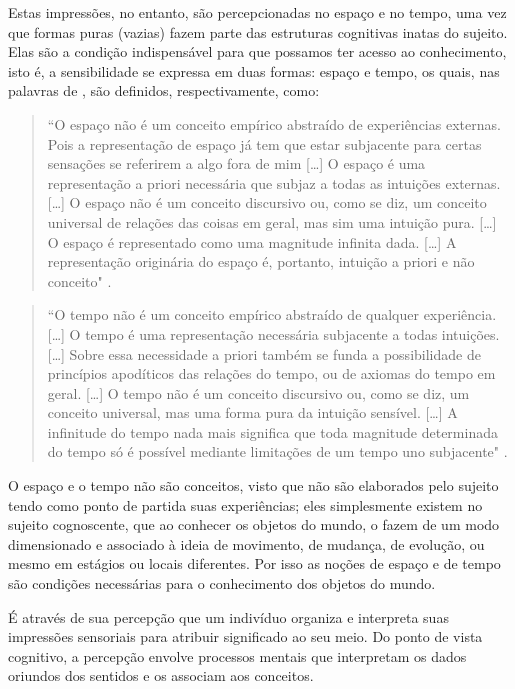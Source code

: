 Estas impressões, no entanto, são percepcionadas no espaço e no tempo, uma vez que formas puras (vazias) fazem parte das estruturas cognitivas inatas do sujeito. Elas são a condição indispensável para que possamos ter acesso ao conhecimento, isto é, a sensibilidade se expressa em duas formas: espaço e tempo, os  quais, nas palavras de , são definidos, respectivamente, como:

\begin{quote}
``O espaço não é um conceito empírico abstraído de experiências externas. Pois a representação de espaço já tem que estar subjacente para certas sensações se referirem a algo fora de mim […] O espaço é uma representação a priori necessária que subjaz a todas as intuições externas. […] O espaço não é um conceito discursivo ou, como se diz, um conceito universal de relações das coisas em geral, mas sim uma intuição pura. […] O espaço é representado como uma magnitude infinita dada. […] A representação originária do espaço é, portanto, intuição a priori e não conceito" \cite[p.41]{kant:1983.critica}.
\end{quote}

\begin{quote}
``O tempo não é um conceito empírico abstraído de qualquer experiência. […] O tempo é uma representação necessária subjacente a todas intuições. […] Sobre essa necessidade a priori também se funda a possibilidade de princípios apodíticos das relações do tempo, ou de axiomas do tempo em geral. […] O tempo não é um conceito discursivo ou, como se diz, um conceito universal, mas uma forma pura da intuição sensível. […] A infinitude do tempo nada mais significa que toda magnitude determinada do tempo só é possível mediante limitações de um tempo uno subjacente" \cite[p.44--45]{kant:1983.critica}. 
\end{quote}

O espaço e o tempo não são conceitos, visto que não são elaborados pelo sujeito tendo como ponto de partida suas experiências; eles simplesmente existem no sujeito cognoscente, que ao conhecer os objetos do mundo, o fazem de um modo dimensionado e associado à ideia de movimento, de mudança, de evolução, ou mesmo em estágios ou locais diferentes. Por isso as noções de espaço e de tempo são condições necessárias para o conhecimento dos objetos do mundo.

É através de sua percepção que um indivíduo organiza e interpreta suas impressões sensoriais para atribuir significado ao seu meio. Do ponto de vista cognitivo, a percepção envolve processos mentais que interpretam os dados oriundos dos sentidos e os associam aos conceitos.


